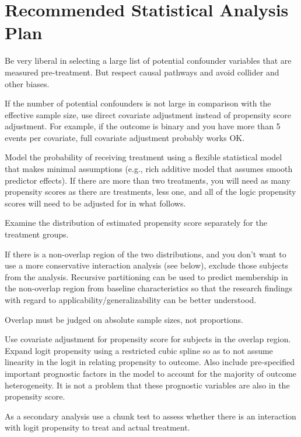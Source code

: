 \section{Recommended Statistical Analysis Plan}
\be
\item Be very liberal in selecting a large list of potential
  confounder variables that are measured pre-treatment.  But respect
  causal pathways and avoid collider and other biases.
\item If the number of potential confounders is not large in
  comparison with the effective sample size, use direct covariate
  adjustment instead of propensity score adjustment.  For example, if
  the outcome is binary and you have more than 5 events per covariate,
  full covariate adjustment probably works OK.
\item Model the probability of receiving treatment using a flexible
  statistical model that makes minimal assumptions (e.g., rich
  additive model that assumes smooth predictor effects).  If there are
  more than two treatments, you will need as many propensity scores as
  there are treatments, less one, and all of the logic propensity
  scores will need to be adjusted for in what follows.
\item Examine the distribution of estimated propensity score
  separately for the treatment groups. 
\item If there is a non-overlap region of the two distributions, and
  you don't want to use a more conservative interaction analysis (see
  below), exclude those subjects from the analysis.  Recursive
  partitioning can be used to predict membership in the non-overlap
  region from baseline characteristics so that the research findings
  with regard to applicability/generalizability can be better
  understood.
\item Overlap must be judged on absolute sample sizes, not proportions.
\item Use covariate adjustment for propensity score for subjects in
  the overlap region.  Expand logit propensity using a restricted
  cubic spline so as to not assume linearity in the logit in relating
  propensity to outcome. Also include pre-specified important
  prognostic factors in the model to account for the majority of
  outcome heterogeneity.  It is not a problem that these prognostic
  variables are also in the propensity score.
\item As a secondary analysis use a chunk test to assess whether there
  is an interaction with logit propensity to treat and actual treatment.
